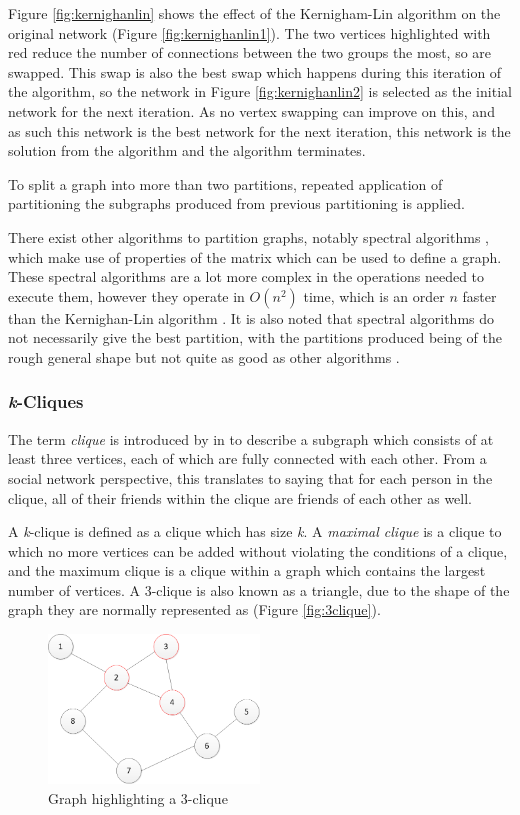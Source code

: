Figure \ref{fig:kernighanlin} shows the effect of the Kernigham-Lin algorithm on the original network (Figure \ref{fig:kernighanlin1}). The two vertices highlighted with red reduce the number of connections between the two groups the most, so are swapped. This swap is also the best swap which happens during this iteration of the algorithm, so the network in Figure \ref{fig:kernighanlin2} is selected as the initial network for the next iteration. As no vertex swapping can improve on this, and as such this network is the best network for the next iteration, this network is the solution from the algorithm and the algorithm terminates.

To split a graph into more than two partitions, repeated application of partitioning the subgraphs produced from previous partitioning is applied.

There exist other algorithms to partition graphs, notably spectral algorithms \cite{pothen90,fiedler73}, which make use of properties of the matrix which can be used to define a graph. These spectral algorithms are a lot more complex in the operations needed to execute them, however they operate in $O(n^2)$ time, which is an order $n$ faster than the Kernighan-Lin algorithm \cite{newman10}. It is also noted that spectral algorithms do not necessarily give the best partition, with the partitions produced being of the rough general shape but not quite as good as other algorithms \cite{newman10}.

\subsubsection{\emph{k}-Cliques}
The term \emph{clique} is introduced by \citeauthor{luce49} in \cite{luce49} to describe a subgraph which consists of at least three vertices, each of which are fully connected with each other. From a social network perspective, this translates to saying that for each person in the clique, all of their friends  within the clique are friends of each other as well.

A \emph{k}-clique is defined as a clique which has size \emph{k}. A \emph{maximal clique} is a clique to which no more vertices can be added without violating the conditions of a clique, and the maximum clique is a clique within a graph which contains the largest number of vertices. A 3-clique is also known as a triangle, due to the shape of the graph they are normally represented as (Figure \ref{fig:3clique}).

\begin{figure}[htbp]
\centering
\includegraphics[width=0.5\textwidth]{./img/clique.png}
\caption{Graph highlighting a 3-clique}
\label{fig:clique}
\end{figure}

